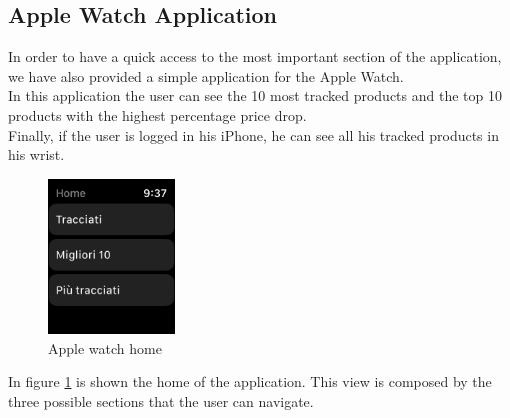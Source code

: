 \subsection{Apple Watch Application}
In order to have a quick access to the most important section of the application, we have also provided a simple application for the Apple Watch.\\
In this application the user can see the 10 most tracked products and the top 10 products with the highest percentage price drop.\\
Finally, if the user is logged in his iPhone, he can see all his tracked products in his wrist.

\begin{figure}[h!]
        \centering
        \includegraphics[width=0.3\textwidth]{images/interfaces/watch_home.png}
         \caption{Apple watch home}
        \label{fig:watch_home}
\end{figure}
\FloatBarrier
In figure \ref{fig:watch_home} is shown the home of the application. This view is composed by the three possible sections that the user can navigate.

